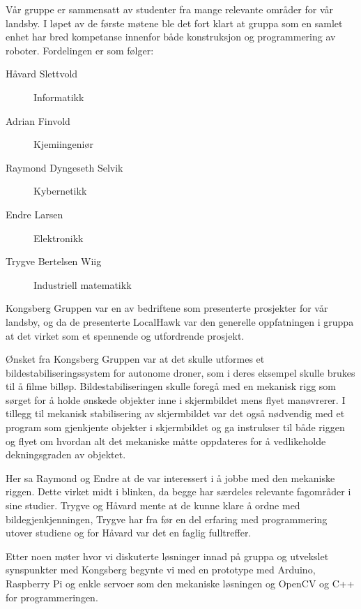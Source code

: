Vår gruppe er sammensatt av studenter fra mange relevante områder for vår landsby. I løpet av de første møtene ble det fort klart at gruppa som en samlet enhet har bred kompetanse innenfor både konstruksjon og programmering av roboter. Fordelingen er som følger:

\begin{description}
	\item[Håvard Slettvold] Informatikk
	\item[Adrian Finvold] Kjemiingeniør
	\item[Raymond Dyngeseth Selvik] Kybernetikk
	\item[Endre Larsen] Elektronikk
	\item[Trygve Bertelsen Wiig] Industriell matematikk
\end{description}

Kongsberg Gruppen var en av bedriftene som presenterte prosjekter for vår landsby, og da de presenterte LocalHawk var den generelle oppfatningen i gruppa at det virket som et spennende og utfordrende prosjekt. 

Ønsket fra Kongsberg Gruppen var at det skulle utformes et bildestabiliseringssystem for autonome droner, som i deres eksempel skulle brukes til å filme billøp. Bildestabiliseringen skulle foregå med en mekanisk rigg som sørget for å holde ønskede objekter inne i skjermbildet mens flyet manøvrerer. I tillegg til mekanisk stabilisering av skjermbildet var det også nødvendig med et program som gjenkjente objekter i skjermbildet og ga instrukser til både riggen og flyet om hvordan alt det mekaniske måtte oppdateres for å vedlikeholde dekningsgraden av objektet. 

Her sa Raymond og Endre at de var interessert i å jobbe med den mekaniske riggen. Dette virket midt i blinken, da begge har særdeles relevante fagområder i sine studier. Trygve og Håvard mente at de kunne klare å ordne med bildegjenkjenningen, Trygve har fra før en del erfaring med programmering utover studiene og for Håvard var det en faglig fulltreffer.

Etter noen møter hvor vi diskuterte løsninger innad på gruppa og utvekslet synspunkter med Kongsberg begynte vi med en prototype med Arduino, Raspberry Pi og enkle servoer som den mekaniske løsningen og OpenCV og C++ for programmeringen.